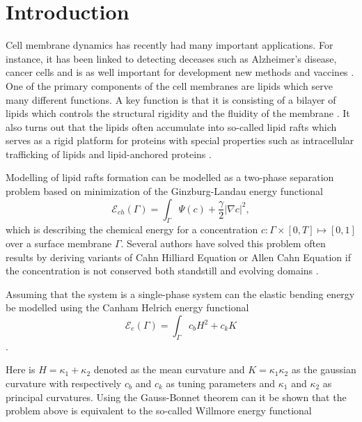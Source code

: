 \section{Introduction}\label{sec:introduction}


Cell membrane dynamics has recently had many important applications. For instance, it has been linked to detecting deceases such as Alzheimer's disease, cancer cells and is as well important for development new methods and vaccines
\cite{small2006sorting}.
One of the primary components of the cell membranes are lipids which serve many different functions. A key function is that it is consisting of a bilayer of lipids which controls the structural rigidity and the fluidity of the membrane \cite{ neidleman87}. It also turns out that the lipids often accumulate into so-called lipid rafts which serves as a rigid platform for proteins with special properties such as intracellular trafficking of lipids and lipid-anchored proteins \cite{Edidin03}.

Modelling of lipid rafts formation can be modelled as a two-phase separation problem based on minimization of the Ginzburg-Landau energy functional \cite{yushutin19}
\[
\mathcal{E}_{ch}  \left( \Gamma  \right) = \int_{\Gamma  }^{}\Psi \left( c \right) + \frac{\gamma}{2} \left\lvert \nabla c \right\rvert^{2} ,
\]
which is describing the chemical energy for a concentration $c: \Gamma \times \left[ 0,T \right] \mapsto  \left[ 0,1 \right]  $ over a surface membrane $\Gamma$. Several authors have solved this problem often results by deriving variants of Cahn
Hilliard Equation or Allen Cahn Equation if the concentration is not conserved both standstill and evolving domains \cite{yushutin19, udo97, ratz16,Gera2017, caetano21,yushutin19} .

Assuming that the system is a single-phase system can the elastic bending energy be modelled using the Canham Helrich energy functional \cite{wang08, udo97} \[
\mathcal{E} _{e}\left( \Gamma  \right) =   \int_{\Gamma }^{}  c_{b} H^{2} + c_{k} K
\].

Here is $H =  \kappa_1 + \kappa_2 $ denoted as the mean curvature and $K = \kappa_1 \kappa_2$ as the gaussian curvature with respectively $c_{b}$ and $c_{k}$ as tuning parameters and $\kappa_1$ and $\kappa_2$ as principal curvatures. Using the Gauss-Bonnet theorem can it be shown that the problem above is equivalent to the so-called Willmore energy
functional \cite{montiel2009curves, willmore1996riemannian}

